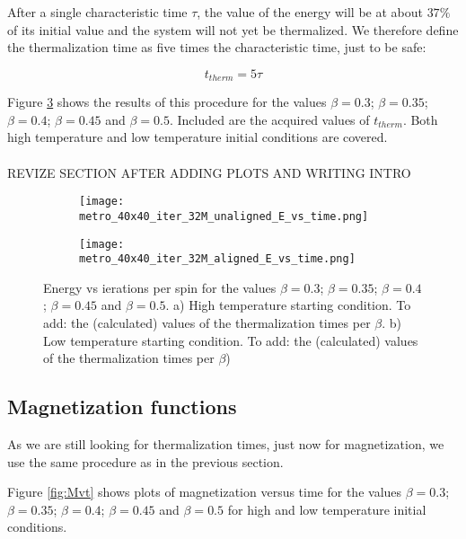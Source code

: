\documentclass[11pt,a4paper]{article}
\begin{document}
After a single characteristic time $\tau$, the value of the energy will be at about $37\%$ of its initial value and
 the system will not yet be thermalized. We therefore define the
 thermalization time as five times the characteristic time, just to be safe:
 
\begin{equation*}
    t_{therm} = 5\tau
\end{equation*}

Figure \ref{fig:Evt} shows the results of this procedure for the values $\beta = 0.3$; $\beta = 0.35$;
 $\beta = 0.4$; $\beta = 0.45$ and $\beta = 0.5$. Included are the acquired values of $t_{therm}$. Both 
 high temperature and low temperature initial conditions are covered.
\\
\\
{\color{red}REVIZE SECTION AFTER ADDING PLOTS AND WRITING INTRO}

\begin{figure}[h!]
\centering
\begin{subfigure}{.5\textwidth}
  \centering
  \texttt{[image: metro\_40x40\_iter\_32M\_unaligned\_E\_vs\_time.png]}
  \caption{}
  \label{fig:Evt_highT}
\end{subfigure}%
\begin{subfigure}{.5\textwidth}
  \centering
  \texttt{[image: metro\_40x40\_iter\_32M\_aligned\_E\_vs\_time.png]}
  \caption{}
  \label{fig:Evt_lowT}
\end{subfigure}
\caption{Energy vs ierations per spin for the values $\beta = 0.3$; $\beta = 0.35$;
         $\beta = 0.4$; $\beta = 0.45$ and $\beta = 0.5$. a) High temperature starting condition. 
         {\color{red}To add: the (calculated) values of the thermalization times per $\beta$}.
         b) Low temperature starting condition.
         {\color{red}To add: the (calculated) values of the thermalization times per $\beta$)}}
\label{fig:Evt}
\end{figure}


\subsection{Magnetization functions}
As we are still looking for thermalization times, just now for magnetization, we use the same procedure as in
 the previous section. 

Figure \ref{fig:Mvt} shows plots of magnetization versus time for the values $\beta = 0.3$; $\beta = 0.35$;
 $\beta = 0.4$; $\beta = 0.45$ and $\beta = 0.5$ for high and low temperature initial conditions. 
\end{document}
